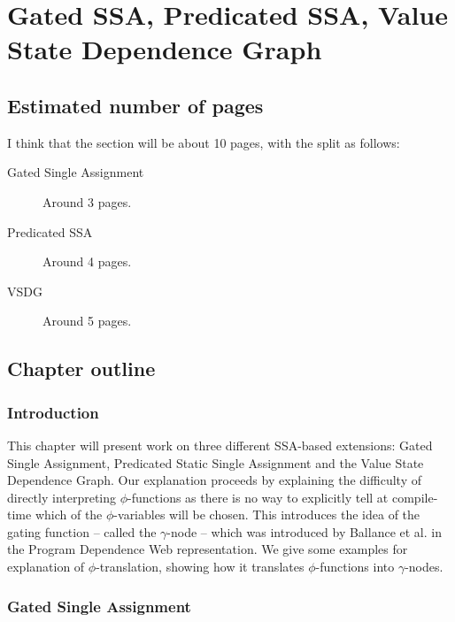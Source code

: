 \chapter*{Gated SSA, Predicated SSA, Value State Dependence Graph}



\section*{Estimated number of pages}

I think that the section will be about 10 pages, with the split as follows:

\begin{description}
\item[Gated Single Assignment] Around 3 pages.
\item[Predicated SSA] Around 4 pages.
\item[VSDG] Around 5 pages.
\end{description}

\section*{Chapter outline}

\subsection*{Introduction}

This chapter will present work on three different SSA-based extensions: Gated Single Assignment, Predicated Static Single Assignment and the Value State Dependence Graph. Our explanation proceeds by explaining the difficulty of directly interpreting $\phi$-functions as there is no way to explicitly tell at compile-time which of the $\phi$-variables will be chosen. This introduces the idea of the gating function -- called the $\gamma$-node -- which was introduced by Ballance et al. in the Program Dependence Web\cite{207115} representation. We give some examples for explanation of $\phi$-translation, showing how it translates $\phi$-functions into $\gamma$-nodes.

\subsection*{Gated Single Assignment}


